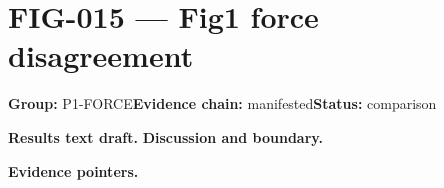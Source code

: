 \clearpage
\section{FIG-015 --- Fig1 force disagreement}
\label{figpage:fig-015}
\textbf{Group:} P1-FORCE\quad \textbf{Evidence chain:} manifested\quad \textbf{Status:} comparison

\textbf{Results text draft.} 
\textbf{Discussion and boundary.} 


\textbf{Evidence pointers.}



\vfill
